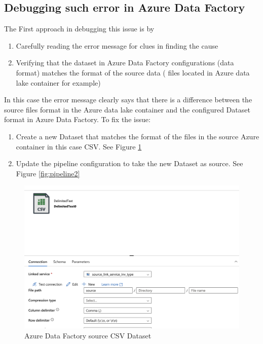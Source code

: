 \documentclass[11pt, oneside]{article}   	%
\begin{document}
\subsection{Debugging such error in Azure Data Factory}
The First approach in debugging this issue is by
\begin{enumerate}
        \item Carefully reading the error message for clues in finding the cause
          \item Verifying that the dataset in Azure Data Factory configurations (data format) matches the format of the source data ( files located in Azure data lake container for example)
\end{enumerate}
In this case the error message clearly says that there is a difference between the source files  format in the Azure data lake container and the configured Dataset format in Azure Data Factory.
To fix the issue:
\begin{enumerate}
        \item Create a new Dataset that matches the format of the files in the source Azure container in this case CSV. See Figure \ref{fig:dataset2}
          \item Update the pipeline configuration to take the new Dataset as source. See Figure  \ref{fig:pipeline2}
\end{enumerate}

\begin{figure}[H] %
   \centering
   \includegraphics[width=6in]{images/source2.png} 
   \caption{Azure Data Factory source CSV Dataset}
   \label{fig:dataset2}
\end{figure}
\end{document}
